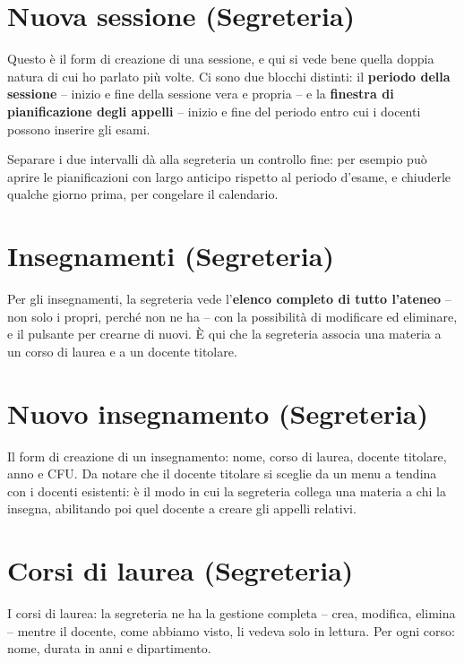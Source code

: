 \documentclass[11pt]{article}
\begin{document}
\section*{Nuova sessione (Segreteria)}

Questo è il form di creazione di una sessione, e qui si vede bene quella doppia natura di
cui ho parlato più volte. Ci sono due blocchi distinti: il \textbf{periodo della
sessione} -- inizio e fine della sessione vera e propria -- e la \textbf{finestra di
pianificazione degli appelli} -- inizio e fine del periodo entro cui i docenti possono
inserire gli esami.

Separare i due intervalli dà alla segreteria un controllo fine: per esempio può aprire
le pianificazioni con largo anticipo rispetto al periodo d'esame, e chiuderle qualche
giorno prima, per congelare il calendario.

\section*{Insegnamenti (Segreteria)}

Per gli insegnamenti, la segreteria vede l'\textbf{elenco completo di tutto l'ateneo} --
non solo i propri, perché non ne ha -- con la possibilità di modificare ed eliminare, e
il pulsante per crearne di nuovi. È qui che la segreteria associa una materia a un corso
di laurea e a un docente titolare.

\section*{Nuovo insegnamento (Segreteria)}

Il form di creazione di un insegnamento: nome, corso di laurea, docente titolare, anno e
CFU. Da notare che il docente titolare si sceglie da un menu a tendina con i docenti
esistenti: è il modo in cui la segreteria collega una materia a chi la insegna,
abilitando poi quel docente a creare gli appelli relativi.

\section*{Corsi di laurea (Segreteria)}

I corsi di laurea: la segreteria ne ha la gestione completa -- crea, modifica, elimina --
mentre il docente, come abbiamo visto, li vedeva solo in lettura. Per ogni corso: nome,
durata in anni e dipartimento.
\end{document}
